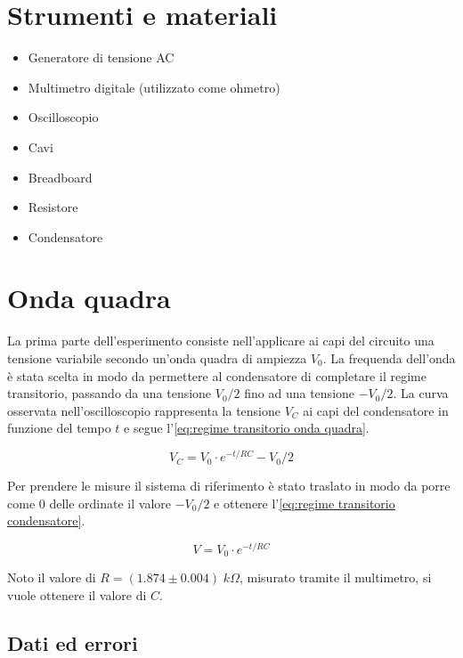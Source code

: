 \documentclass[11pt, a4paper]{article}
\numberwithin{equation}{section} %
\begin{document}
\section{Strumenti e materiali}

\begin{itemize}
    \item Generatore di tensione AC
    \item Multimetro digitale (utilizzato come ohmetro)
    \item Oscilloscopio
    \item Cavi
    \item Breadboard
    \item Resistore
    \item Condensatore
\end{itemize}

\section{Onda quadra}

La prima parte dell'esperimento consiste nell'applicare ai capi del circuito una tensione variabile secondo un'onda quadra di ampiezza \(V_{0}\). La frequenda dell'onda è stata scelta in modo da permettere al condensatore di completare il regime transitorio, passando da una tensione \(V_{0}/2\) fino ad una tensione \(- V_{0}/2\). La curva osservata nell'oscilloscopio rappresenta la tensione \(V_{C}\) ai capi del condensatore in funzione del tempo \(t\) e segue l'\autoref{eq:regime transitorio onda quadra}.

\begin{equation} \label{eq:regime transitorio onda quadra}
    V_{C} = V_{0} \cdot e^{-t/RC} - V_{0}/2
\end{equation}

Per prendere le misure il sistema di riferimento è stato traslato in modo da porre come \(0\) delle ordinate il valore \(- V_{0}/2\) e ottenere l'\autoref{eq:regime transitorio condensatore}.

\begin{equation} \label{eq:regime transitorio condensatore}
    V = V_{0} \cdot e^{-t/RC}
\end{equation}

Noto il valore di \(R = (1.874 \pm 0.004) \; \unit{k\Omega}\), misurato tramite il multimetro, si vuole ottenere il valore di \(C\).

\subsection{Dati ed errori}
\end{document}

